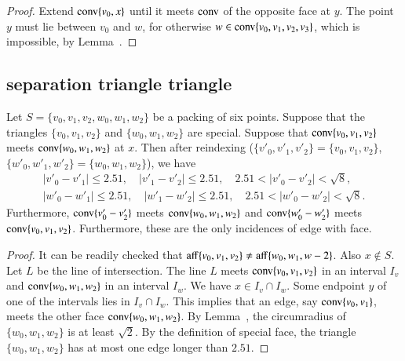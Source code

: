 \begin{tarskidata}
\begin{tarski}
\begin{proof}  Extend ${\operatorname{conv}}\{v_0,x\}$ until it meets
${\operatorname{conv}}$ of the opposite face at $y$.  The point $y$ must lie between
$v_0$ and $w$, for otherwise $w\in{\operatorname{conv}}\{v_0,v_1,v_2,v_3\}$,
which is impossible, by Lemma~.
\end{proof}
\end{tarski}







\begin{tarski}
\subsection{separation triangle triangle}

\begin{lemma}
Let $S=\{v_0,v_1,v_2,w_0,w_1,w_2\}$ be a packing of six points. 
Suppose that the triangles $\{v_0,v_1,v_2\}$ and $\{w_0,w_1,w_2\}$
are special.  Suppose that ${\operatorname{conv}}\{v_0,v_1,v_2\}$ meets
${\operatorname{conv}}\{w_0,w_1,w_2\}$ at $x$.  Then after reindexing
($\{v'_0,v'_1,v'_2\}=\{v_0,v_1,v_2\}$, $\{w'_0,w'_1,w'_2\} = \{w_0,w_1,w_2\}$),
we have 
   $$
   \begin{array}{lll}
   |v'_0-v'_1|\le 2.51,\quad |v'_1-v'_2|\le 2.51,\quad 2.51 < |v'_0-v'_2|<\sqrt8,\\
   |w'_0-w'_1|\le 2.51,\quad |w'_1-w'_2|\le 2.51,\quad 2.51 < |w'_0-w'_2|<\sqrt8.
   \end{array}
   $$
Furthermore, ${\operatorname{conv}}\{v'_0-v'_2\}$ meets ${\operatorname{conv}}\{w_0,w_1,w_2\}$
and  ${\operatorname{conv}}\{w'_0-w'_2\}$ meets ${\operatorname{conv}}\{v_0,v_1,v_2\}$.
Furthermore, these are the only incidences of edge with face.
\end{lemma}

\begin{proof}
It can be readily checked that ${\operatorname{aff}}\{v_0,v_1,v_2\}\ne
{\operatorname{aff}}\{w_0,w_1,w-2\}$.  Also $x\not\in S$.
Let $L$ be the line of intersection.
The line $L$ meets ${\operatorname{conv}}\{v_0,v_1,v_2\}$ in an interval $I_v$
and ${\operatorname{conv}}\{w_0,w_1,w_2\}$ in an interval $I_w$.  We have
$x\in I_v\cap I_w$.  Some endpoint $y$ of one of the intervals lies
in $I_v\cap I_w$.  This implies that an edge, say ${\operatorname{conv}}\{v_0,v_1\}$,
meets the other face ${\operatorname{conv}}\{w_0,w_1,w_2\}$.  
By Lemma~,
the circumradius of $\{w_0,w_1,w_2\}$ is at least $\sqrt2$.  By
the definition of special face, the triangle $\{w_0,w_1,w_2\}$
has at most one edge longer than $2.51$.


\end{proof}
\end{tarski}
\end{tarskidata}
